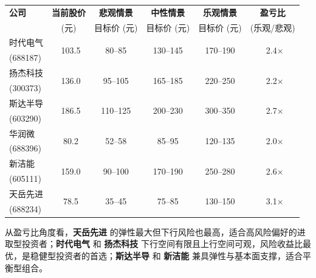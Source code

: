 \begin{exhibitbox}[表 10-3：核心标的三情景目标价区间]
\centering
\small
\begin{tabularx}{\textwidth}{l c c c c c}
\toprule
\textbf{公司} & \textbf{当前股价} & \textbf{悲观情景} & \textbf{中性情景} & \textbf{乐观情景} & \textbf{盈亏比} \\
& (元) & 目标价 (元) & 目标价 (元) & 目标价 (元) & (乐观/悲观) \\
\midrule
\rowcolor{riskgreen!5}
时代电气 & \multirow{2}{*}{~103.5} & \multirow{2}{*}{80–85} & \multirow{2}{*}{130–145} & \multirow{2}{*}{170–190} & \multirow{2}{*}{~2.4×} \\
\rowcolor{riskgreen!5}
(688187) & & & & & \\
\rowcolor{riskgreen!5}
扬杰科技 & \multirow{2}{*}{~136.0} & \multirow{2}{*}{95–105} & \multirow{2}{*}{165–185} & \multirow{2}{*}{220–250} & \multirow{2}{*}{~2.2×} \\
\rowcolor{riskgreen!5}
(300373) & & & & & \\
\rowcolor{accentblue!5}
斯达半导 & \multirow{2}{*}{~186.5} & \multirow{2}{*}{110–125} & \multirow{2}{*}{200–230} & \multirow{2}{*}{300–350} & \multirow{2}{*}{~2.7×} \\
\rowcolor{accentblue!5}
(603290) & & & & & \\
\rowcolor{accentblue!5}
华润微 & \multirow{2}{*}{~80.2} & \multirow{2}{*}{52–58} & \multirow{2}{*}{85–95} & \multirow{2}{*}{120–135} & \multirow{2}{*}{~2.0×} \\
\rowcolor{accentblue!5}
(688396) & & & & & \\
\rowcolor{accentblue!5}
新洁能 & \multirow{2}{*}{~159.0} & \multirow{2}{*}{90–100} & \multirow{2}{*}{170–190} & \multirow{2}{*}{250–280} & \multirow{2}{*}{~2.6×} \\
\rowcolor{accentblue!5}
(605111) & & & & & \\
\rowcolor{riskamber!5}
天岳先进 & \multirow{2}{*}{~78.5} & \multirow{2}{*}{35–45} & \multirow{2}{*}{75–85} & \multirow{2}{*}{130–150} & \multirow{2}{*}{~3.1×} \\
\rowcolor{riskamber!5}
(688234) & & & & & \\
\bottomrule
\end{tabularx}
\end{exhibitbox}

从盈亏比角度看，\textbf{天岳先进} 的弹性最大但下行风险也最高，适合高风险偏好的进取型投资者；\textbf{时代电气} 和 \textbf{扬杰科技} 下行空间有限且上行空间可观，风险收益比最优，是稳健型投资者的首选；\textbf{斯达半导} 和 \textbf{新洁能} 兼具弹性与基本面支撑，适合平衡型组合。

